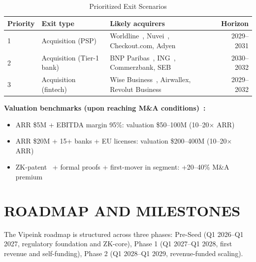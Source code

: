 \documentclass[11pt,a4paper]{article}
\begin{document}
\begin{table}[htbp]
\centering
\caption{Prioritized Exit Scenarios}
\begin{tabularx}{\linewidth}{@{}llXr@{}}
\toprule
\textbf{Priority} & \textbf{Exit type} & \textbf{Likely acquirers} & \textbf{Horizon} \\
\midrule
1 & Acquisition (PSP)         & Worldline~\cite{worldline_ar}, Nuvei~\cite{nuvei_ar}, Checkout.com, Adyen~\cite{adyen_ar}       & 2029--2031 \\
2 & Acquisition (Tier-1 bank) & BNP Paribas~\cite{bnp_ar}, ING~\cite{ing_ar}, Commerzbank, SEB          & 2030--2032 \\
3 & Acquisition (fintech)     & Wise Business~\cite{wise_ar}, Airwallex, Revolut Business  & 2029--2032 \\
\bottomrule
\end{tabularx}
\end{table}

\noindent\textbf{Valuation benchmarks (upon reaching M\&A conditions)~\cite{pitchbook,temenos_ar}:}
\begin{itemize}[leftmargin=2em, itemsep=3pt, parsep=0pt]
\item ARR \$5M + EBITDA margin 95\%: valuation \$50--100M (10--20$\times$ ARR)
\item ARR \$20M + 15+ banks + EU licenses: valuation \$200--400M (10--20$\times$ ARR)
\item ZK-patent~\cite{wipo_pct} + formal proofs + first-mover in segment: +20--40\% M\&A premium
\end{itemize}


\FloatBarrier
\section{ROADMAP AND MILESTONES}

The Vipeink roadmap is structured across three phases: Pre-Seed (Q1 2026--Q1 2027, regulatory foundation and ZK-core), Phase 1 (Q1 2027--Q1 2028, first revenue and self-funding), Phase 2 (Q1 2028--Q1 2029, revenue-funded scaling).
\end{document}
